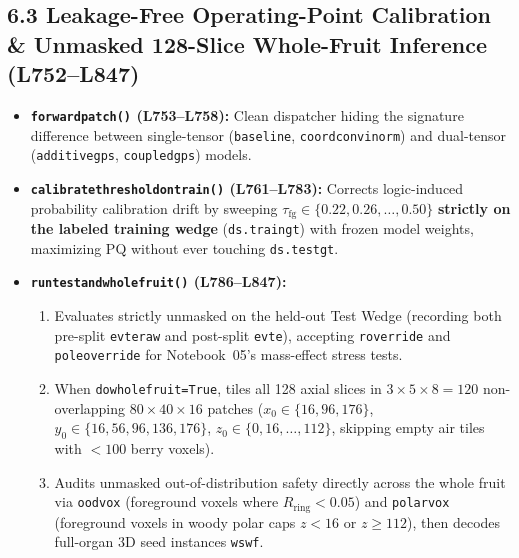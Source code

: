 \documentclass[10pt,a4paper]{article}
\renewcommand{\_}{\origunderscore\allowbreak}
\begin{document}
\subsection*{6.3 Leakage-Free Operating-Point Calibration \& Unmasked 128-Slice Whole-Fruit Inference (L752--L847)}
\begin{annotbox}
\begin{itemize}
    \item \textbf{\texttt{forward\_patch()} (L753--L758):} Clean dispatcher hiding the signature difference between single-tensor (\texttt{baseline}, \texttt{coordconv\_inorm}) and dual-tensor (\texttt{additive\_gps}, \texttt{coupled\_gps}) models.
    \item \textbf{\texttt{calibrate\_threshold\_on\_train()} (L761--L783):} Corrects logic-induced probability calibration drift by sweeping $\tau_{\text{fg}} \in \{0.22, 0.26, \dots, 0.50\}$ \textbf{strictly on the labeled training wedge} (\texttt{ds.train\_gt}) with frozen model weights, maximizing $\text{PQ}$ without ever touching \texttt{ds.test\_gt}.
    \item \textbf{\texttt{run\_test\_and\_whole\_fruit()} (L786--L847):}
    \begin{enumerate}
        \item Evaluates strictly unmasked on the held-out Test Wedge (recording both pre-split \texttt{ev\_te\_raw} and post-split \texttt{ev\_te}), accepting \texttt{r\_override} and \texttt{pole\_override} for Notebook~05's mass-effect stress tests.
        \item When \texttt{do\_whole\_fruit=True}, tiles all 128 axial slices in $3 \times 5 \times 8 = 120$ non-overlapping $80 \times 40 \times 16$ patches ($x_0 \in \{16, 96, 176\}$, $y_0 \in \{16, 56, 96, 136, 176\}$, $z_0 \in \{0, 16, \dots, 112\}$, skipping empty air tiles with $<100$ berry voxels).
        \item Audits unmasked out-of-distribution safety directly across the whole fruit via \texttt{ood\_vox} (foreground voxels where $R_{\text{ring}} < 0.05$) and \texttt{polar\_vox} (foreground voxels in woody polar caps $z < 16$ or $z \ge 112$), then decodes full-organ 3D seed instances \texttt{ws\_wf}.
    \end{enumerate}
\end{itemize}
\end{annotbox}
\end{document}
